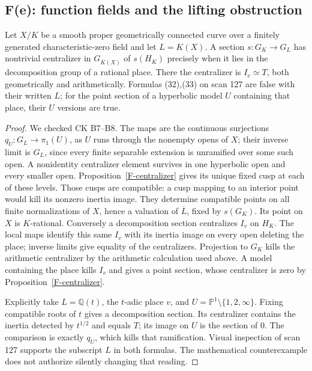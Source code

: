 \subsection{F(e): function fields and the lifting obstruction}

\begin{proposition}
\label{F-birational}
Let $X/K$ be a smooth proper geometrically connected curve over a
finitely generated characteristic-zero field and let $L=K(X)$.
A section $s:G_K\to G_L$ has nontrivial centralizer in
$G_{\overline K(X)}$ of $s(H_K)$ precisely when it lies in the
decomposition group of a rational place. There the centralizer is
$I_v\simeq T$, both geometrically and arithmetically. Formulas
(32),(33) on scan 127 are false with their written $L$; for the
point section of a hyperbolic model $U$ containing that place,
their $U$ versions are true.
\end{proposition}
\begin{proof}
We checked CK B7--B8. The maps are the continuous surjections
$q_U:G_L\to\pi_1(U)$, as $U$ runs through the nonempty opens of
$X$; their inverse limit is $G_L$, since every finite separable
extension is unramified over some such open. A nonidentity
centralizer element survives in one hyperbolic open and every
smaller open. Proposition~\ref{F-centralizer} gives its unique
fixed cusp at each of these levels. Those cusps are compatible:
a cusp mapping to an interior point would kill its nonzero
inertia image. They determine compatible points on all finite
normalizations of $X$, hence a valuation of $\overline L$, fixed
by $s(G_K)$. Its point on $X$ is $K$-rational. Conversely a
decomposition section centralizes $I_v$ on $H_K$. The local
maps identify this same $I_v$ with its inertia image on every
open deleting the place; inverse limits give equality of the
centralizers. Projection to $G_K$ kills the arithmetic centralizer
by the arithmetic calculation used above. A model containing the
place kills $I_v$ and gives a point section, whose centralizer is
zero by Proposition~\ref{F-centralizer}.

Explicitly take $L=\mathbb Q(t)$, the $t$-adic place $v$, and
$U=\mathbb P^1\setminus\{1,2,\infty\}$. Fixing compatible roots
of $t$ gives a decomposition section. Its centralizer contains the
inertia detected by $t^{1/2}$ and equals $T$; its image on $U$ is
the section of $0$. The comparison is exactly $q_U$, which kills
that ramification. Visual inspection of scan 127 supports the
subscript $L$ in both formulas. The mathematical counterexample
does not authorize silently changing that reading.
\end{proof}

